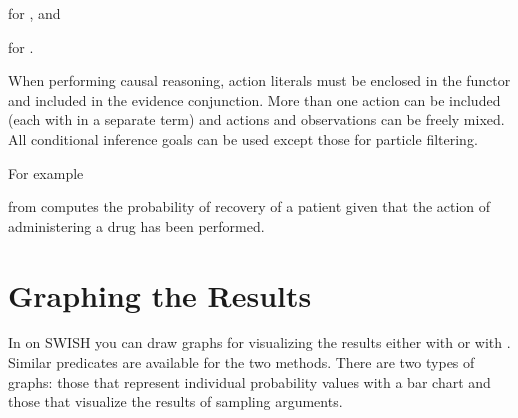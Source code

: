 \documentclass[letterpaper,10pt,english]{sphinxmanual}
\begin{document}
\begin{sphinxVerbatim}[commandchars=\\\{\}]
  
\end{sphinxVerbatim}

\sphinxAtStartPar
for , and

\begin{sphinxVerbatim}[commandchars=\\\{\}]
  
\end{sphinxVerbatim}

\sphinxAtStartPar
for .

\sphinxAtStartPar
When performing causal reasoning, action literals must be enclosed in the  functor and included in the evidence conjunction.
More than one action can be included (each with in a separate  term) and actions and observations can be freely mixed.
All conditional inference goals can be used except those for particle filtering.

\sphinxAtStartPar
For example

\begin{sphinxVerbatim}[commandchars=\\\{\}]
 
\end{sphinxVerbatim}

\sphinxAtStartPar
from  computes the probability of recovery of a patient given that the action of administering a drug has been performed.


\section{Graphing the Results}
\label{\detokenize{index:graphing-the-results}}
\sphinxAtStartPar
In  on SWISH you can draw graphs for visualizing the results either with  or with .
Similar predicates are available for the two methods.
There are two types of graphs: those that represent individual probability values with a bar chart and those that visualize the results of sampling arguments.
\end{document}
